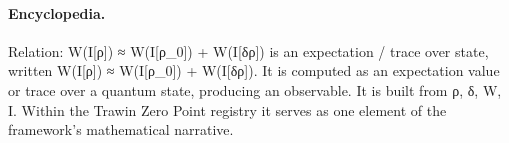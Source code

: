 \paragraph{Encyclopedia.}
Relation: W(I[ρ]) ≈ W(I[ρ\_0]) + W(I[δρ]) is an expectation / trace over state, written W(I[ρ]) ≈ W(I[ρ\_0]) + W(I[δρ]). It is computed as an expectation value or trace over a quantum state, producing an observable. It is built from ρ, δ, W, I. Within the Trawin Zero Point registry it serves as one element of the framework's mathematical narrative.
